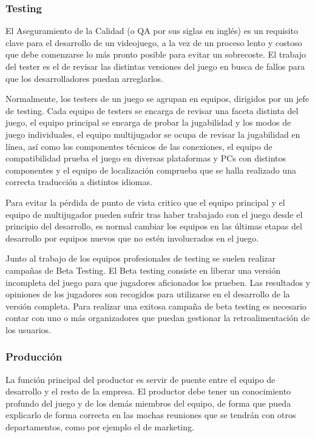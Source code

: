 \subsubsection{Testing}
El Aseguramiento de la Calidad (o QA por sus siglas en inglés) es un requisito clave para el desarrollo de un videojuego, a la vez de un proceso lento y costoso que debe comenzarse lo más pronto posible para evitar un sobrecoste\cite{development_and_production}. El trabajo del tester es el de revisar las distintas versiones del juego en busca de fallos para que los desarrolladores puedan arreglarlos.

Normalmente, los testers de un juego se agrupan en equipos, dirigidos por un jefe de testing. Cada equipo de testers se encarga de revisar una faceta distinta del juego, el equipo principal se encarga de probar la jugabilidad y los modos de juego individuales, el equipo multijugador se ocupa de revisar la jugabilidad en línea, así como los componentes técnicos de las conexiones, el equipo de compatibilidad prueba el juego en diversas plataformas y PCs con distintos componentes y el equipo de localización comprueba que se halla realizado una correcta traducción a distintos idiomas.

Para evitar la pérdida de punto de vista critico que el equipo principal y el equipo de multijugador pueden sufrir tras haber trabajado con el juego desde el principio del desarrollo, es normal cambiar los equipos en las últimas etapas del desarrollo por equipos nuevos que no estén involucrados en el juego.

Junto al trabajo de los equipos profesionales de testing se suelen realizar campañas de Beta Testing. El Beta testing consiste en liberar una versión incompleta del juego para que jugadores aficionados los prueben. Las resultados y opiniones de los jugadores son recogidos para utilizarse en el desarrollo de la versión completa. Para realizar una exitosa campaña de beta testing es necesario contar con uno o más organizadores que puedan gestionar la retroalimentación de los usuarios.

\subsubsection{Producción}
La función principal del productor es servir de puente entre el equipo de desarrollo y el resto de la empresa. El productor debe tener un conocimiento profundo del juego y de los demás miembros del equipo, de forma que pueda explicarlo de forma correcta en las mochas reuniones que se tendrán con otros departamentos, como por ejemplo el de marketing\cite{game_design_2}.

